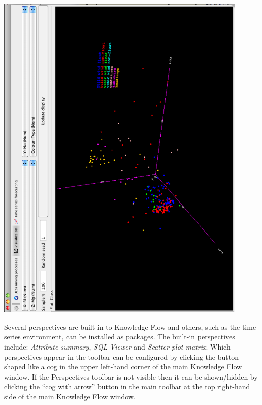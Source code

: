 \begin{center}
  \includegraphics[angle=270,width=12cm]{images/knowledgeflow/scatterPlot3DPerspective.eps}
\end{center}

Several perspectives are built-in to Knowledge Flow and others, such
as the time series environment, can be installed as packages. The
built-in perspectives include: \textit{Attribute summary}, \textit{SQL
  Viewer} and \textit{Scatter plot matrix}. Which perspectives appear
in the toolbar can be configured by clicking the button shaped like a
cog in the upper left-hand corner of the main Knowledge Flow
window. If the Perspectives toolbar is not visible then it can be
shown/hidden by clicking the ``cog with arrow'' button in the main
toolbar at the top right-hand side of the main Knowledge Flow window.
